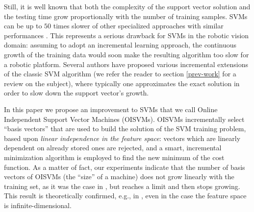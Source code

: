 Still, it is well known that 
both
the complexity of the
support vector solution and the testing time grow proportionally with the number of
training samples. SVMs can be up to $50$ times slower of other
specialized approaches with similar performances
\cite{BurgesS96}. This represents a serious drawback for SVMs in the robotic vision 
domain: assuming to adopt an incremental learning approach, the continuous growth of the training data would
soon make the resulting algorithm too slow for a robotic platform.
Several authors have proposed various incremental extensions of the classic SVM algorithm (we refer the reader to section
\ref{prev-work} for a review on the subject), where typically one approximates the exact solution in order to
slow down the support vector's growth.

In this paper we propose an improvement to SVMs that we call Online
Independent Support Vector Machines (OISVMs). OISVMs incrementally
select ``basis vectors'' that are used to build the solution of the
SVM training problem, based upon \emph{linear independence in the
feature space}: vectors which are linearly dependent on already stored
ones are rejected, and a smart, incremental minimization algorithm is
employed to find the new minimum of the cost function. As a matter of
fact, our experiments indicate that the number of basis vectors of
OISVMs (the ``size'' of a machine) does not grow linearly with the
training set, as it was the case in \cite{Steinwart03}, but reaches a
limit and then stops growing. This result is theoretically confirmed,
e.g., in \cite{engel2004}, even in the case the feature space is
infinite-dimensional.

